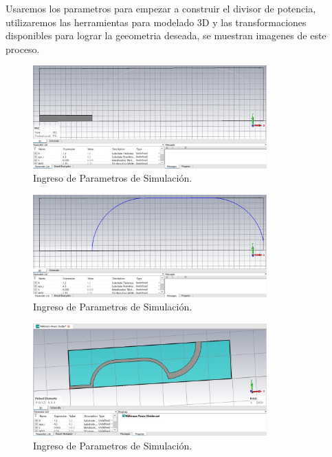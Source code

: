 \documentclass[a4paper]{IEEEtran} %
\begin{document}
Usaremos los parametros para empezar a construir el divisor de potencia, utilizaremos las herramientas para modelado 3D y las transformaciones disponibles para lograr la geeometria deseada, se muestran imagenes de este proceso.

\begin{figure}[h]    
    \centering
        \includegraphics[width=9cm]{imagenes/img6}
        \caption{Ingreso de Parametros de Simulación.}
        \label{fig:modelamiento1}
\end{figure} 
\vspace{50mm}
\begin{figure}[h]    
    \centering
        \includegraphics[width=9cm]{imagenes/img7}
        \caption{Ingreso de Parametros de Simulación.}
        \label{fig:modelamiento2}
\end{figure} 
\begin{figure}[h]    
    \centering
        \includegraphics[width=9cm]{imagenes/img8}
        \caption{Ingreso de Parametros de Simulación.}
        \label{fig:modelamiento3}
\end{figure} 
\end{document}
